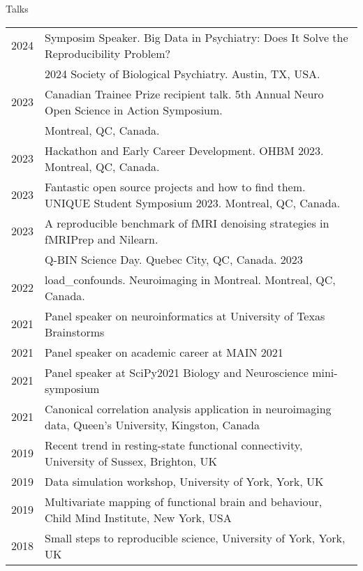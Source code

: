 \documentclass{resume} %
\begin{document}
\begin{rSection}{Talks}
  \begin{tabular}{@{} l l @{\hspace{10ex}}}
    2024 & Symposim Speaker. Big Data in Psychiatry: Does It Solve the Reproducibility Problem? \\ & 2024 Society of Biological Psychiatry. Austin, TX, USA.\\
    2023 & Canadian Trainee Prize recipient talk. 5th Annual Neuro Open Science in Action Symposium.  \\& Montreal, QC, Canada.\\
    2023 & Hackathon and Early Career Development. OHBM 2023. Montreal, QC, Canada.\\
    2023 & Fantastic open source projects and how to find them. UNIQUE Student Symposium 2023. Montreal, QC, Canada.\\
    2023 & A reproducible benchmark of fMRI denoising strategies in fMRIPrep and Nilearn. \\ & Q-BIN Science Day. Quebec City, QC, Canada. 2023\\
   	2022 & load\_confounds. Neuroimaging in Montreal. Montreal, QC, Canada.\\
    2021 & Panel speaker on neuroinformatics at University of Texas Brainstorms\\
    2021 & Panel speaker on academic career at MAIN 2021\\
    2021 & Panel speaker at SciPy2021 Biology and Neuroscience mini-symposium\\
  	2021 & Canonical correlation analysis application in neuroimaging data, Queen's University, Kingston, Canada\\
    2019 & Recent trend in resting-state functional connectivity, University of Sussex, Brighton, UK\\
    2019 & Data simulation workshop, University of York, York, UK\\
    2019 & Multivariate mapping of functional brain and behaviour, Child Mind Institute, New York, USA\\
    2018 & Small steps to reproducible science, University of York, York, UK\\
  \end{tabular}
\end{rSection}
\end{document}

